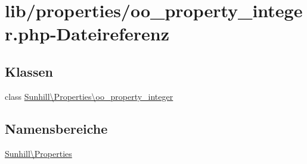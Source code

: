 \hypertarget{oo__property__integer_8php}{}\section{lib/properties/oo\+\_\+property\+\_\+integer.php-\/\+Dateireferenz}
\label{oo__property__integer_8php}
\subsection*{Klassen}
\begin{DoxyCompactItemize}
\item 
class \hyperlink{classSunhill_1_1Properties_1_1oo__property__integer}{Sunhill\textbackslash{}\+Properties\textbackslash{}oo\+\_\+property\+\_\+integer}
\end{DoxyCompactItemize}
\subsection*{Namensbereiche}
\begin{DoxyCompactItemize}
\item 
 \hyperlink{namespaceSunhill_1_1Properties}{Sunhill\textbackslash{}\+Properties}
\end{DoxyCompactItemize}
